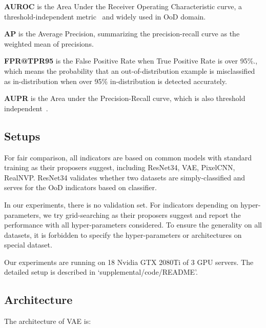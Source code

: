 \documentclass[a3paper]{article}
\begin{document}
\noindent \textbf{AUROC} is the Area Under the Receiver Operating Characteristic curve, a threshold-independent metric~\cite{davis2006relationship} and widely used in OoD domain.


\noindent \textbf{AP} is the Average Precision, summarizing the precision-recall curve as the weighted mean of precisions.

\noindent \textbf{FPR@TPR95} is the False Positive Rate when True Positive Rate is over 95\%., which means the probability that an out-of-distribution example is misclassified as in-distribution when over 95\% in-distribution is detected accurately.

\noindent \textbf{AUPR} is the Area under the Precision-Recall curve, which is also threshold independent~\cite{saito2015precision}. %


\subsection{Setups}
For fair comparison, all indicators are based on common models with standard training as their proposers suggest, including ResNet34, VAE, PixelCNN, RealNVP. ResNet34 validates whether two datasets are simply-classified and serves for the OoD indicators based on classifier.

In our experiments, there is no validation set. For indicators depending on hyper-parameters, we try grid-searching as their proposers suggest and report the performance with all hyper-parameters considered. To ensure the generality on all datasets, it is forbidden to specify the hyper-parameters or architectures on special dataset.

Our experiments are running on 18 Nvidia GTX 2080Ti of 3 GPU servers. The detailed setup is described in `supplemental/code/README'.  
\subsection{Architecture}
The architecture of VAE is: 
\end{document}
